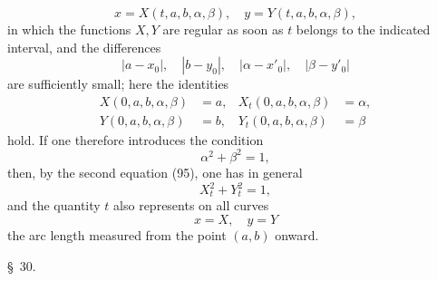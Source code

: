 \documentclass[11pt,a4paper,leqno]{article}
\begin{document}
\begin{equation}\tag{97}
x=X(t,a,b,\alpha,\beta),
\quad
y=Y(t,a,b,\alpha,\beta),
\end{equation}
in which the functions $X,Y$ are regular as soon as $t$ belongs to the indicated interval, and the differences
\[
|a-x_0|,
\quad
|b-y_0|,
\quad
|\alpha-x'_0|,
\quad
|\beta-y'_0|
\]
are sufficiently small; here the identities
\begin{equation}\tag{98}
\begin{aligned}
X(0,a,b,\alpha,\beta)&=a,
&X_t(0,a,b,\alpha,\beta)&=\alpha,\\
Y(0,a,b,\alpha,\beta)&=b,
&Y_t(0,a,b,\alpha,\beta)&=\beta
\end{aligned}
\end{equation}
hold. If one therefore introduces the condition
\[
\alpha^2+\beta^2=1,
\]
then, by the second equation (95), one has in general
\[
X_t^2+Y_t^2=1,
\]
and the quantity $t$ also represents on all curves
\[
x=X,
\quad
y=Y
\]
the arc length measured from the point $(a,b)$ onward.

\begin{center}{\large \S~30.}\end{center}
\end{document}
